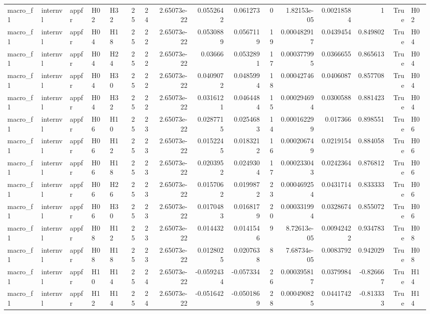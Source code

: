 \begin{table}[tbp]
\begin{tabular}{lllllrrrrrrrrrrl}
macro\_f1 & internvl & appfr & H02 & H32 & 25 & 24 & 2.65073e-22 & 0.0552642 & 0.061273 & 0 & 1.82153e-05 & 0.00218584 & 1 & True & H02 \\
macro\_f1 & internvl & appfr & H04 & H18 & 25 & 22 & 2.65073e-22 & 0.0530889 & 0.0567119 & 19 & 0.000482917 & 0.0439454 & 0.849802 & True & H04 \\
macro\_f1 & internvl & appfr & H04 & H24 & 25 & 22 & 2.65073e-22 & 0.03666 & 0.0532891 & 17 & 0.000377995 & 0.0366655 & 0.865613 & True & H04 \\
macro\_f1 & internvl & appfr & H04 & H30 & 25 & 22 & 2.65073e-22 & 0.0409072 & 0.0485994 & 18 & 0.00042746 & 0.0406087 & 0.857708 & True & H04 \\
macro\_f1 & internvl & appfr & H04 & H32 & 25 & 22 & 2.65073e-22 & 0.0316121 & 0.0464484 & 15 & 0.000294694 & 0.0300588 & 0.881423 & True & H04 \\
macro\_f1 & internvl & appfr & H06 & H10 & 25 & 23 & 2.65073e-22 & 0.0287715 & 0.0254683 & 14 & 0.000162299 & 0.017366 & 0.898551 & True & H06 \\
macro\_f1 & internvl & appfr & H06 & H12 & 25 & 23 & 2.65073e-22 & 0.0152245 & 0.0183212 & 16 & 0.000206749 & 0.0219154 & 0.884058 & True & H06 \\
macro\_f1 & internvl & appfr & H06 & H18 & 25 & 23 & 2.65073e-22 & 0.0203952 & 0.0249304 & 17 & 0.000233043 & 0.0242364 & 0.876812 & True & H06 \\
macro\_f1 & internvl & appfr & H06 & H26 & 25 & 23 & 2.65073e-22 & 0.0157062 & 0.0199872 & 23 & 0.000469254 & 0.0431714 & 0.833333 & True & H06 \\
macro\_f1 & internvl & appfr & H06 & H30 & 25 & 23 & 2.65073e-22 & 0.0170483 & 0.0168179 & 20 & 0.000331994 & 0.0328674 & 0.855072 & True & H06 \\
macro\_f1 & internvl & appfr & H08 & H12 & 25 & 23 & 2.65073e-22 & 0.014432 & 0.0141546 & 9 & 8.72613e-05 & 0.00942422 & 0.934783 & True & H08 \\
macro\_f1 & internvl & appfr & H08 & H18 & 25 & 23 & 2.65073e-22 & 0.0128025 & 0.0207638 & 8 & 7.68734e-05 & 0.0083792 & 0.942029 & True & H08 \\
macro\_f1 & internvl & appfr & H10 & H14 & 25 & 24 & 2.65073e-22 & -0.0592434 & -0.057334 & 26 & 0.000395817 & 0.0379984 & -0.826667 & True & H14 \\
macro\_f1 & internvl & appfr & H12 & H14 & 25 & 24 & 2.65073e-22 & -0.051642 & -0.0501869 & 28 & 0.000490825 & 0.0441742 & -0.813333 & True & H14 \\

\end{tabular}
\end{table}

